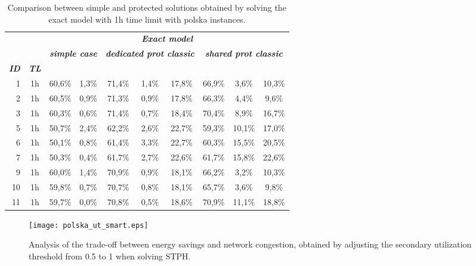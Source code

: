 \documentclass[final,5p,times,twocolumn]{elsarticle}
\begin{document}
\begin{table}[!tbp]
\centering
\scriptsize
\tabcolsep 3pt
\begin{tabular}{rccccccccc}
& & \multicolumn{8}{c}{\textbf{\textit{Exact model}}} \\
\cline{3-10}
& & \multicolumn{2}{c}{\textbf{\textit{simple case}}} & \multicolumn{3}{c}{\textbf{\textit{dedicated prot classic}}} & \multicolumn{3}{c}{\textbf{\textit{shared prot classic}}}  \\ 
\hline
\textbf{\textit{ID}} & \textbf{\textit{TL}} & \textbf{\textit{}} & \textbf{\textit{}} & \textbf{\textit{}} & \textbf{\textit{}} & \textbf{\textit{}} & \textbf{\textit{}} & \textbf{\textit{}} & \textbf{\textit{}} \\ 
\hline
1 & 1h & 60,6\% & 1,3\% & 71,4\% & 1,4\% & 17,8\% & 66,9\% & 3,6\% & 10,3\%   \\
2 & 1h & 60,5\% & 0,9\% & 71,3\% & 0,9\% & 17,8\% & 66,3\% & 4,4\% & 9,6\%    \\ 
3 & 1h & 60,3\% & 0,6\% & 71,4\% & 0,7\% & 18,4\% & 70,4\% & 8,9\% & 16,7\%   \\
5 & 1h & 50,7\% & 2,4\% & 62,2\% & 2,6\% & 22,7\% & 59,3\% & 10,1\% & 17,0\%  \\
6 & 1h & 50,1\% & 0,8\% & 61,4\% & 3,3\% & 22,7\% & 60,3\% & 15,5\% & 20,5\%  \\
7 & 1h & 50,3\% & 0,4\% & 61,7\% & 2,7\% & 22,6\% & 61,7\% & 15,8\% & 22,6\%  \\
9 & 1h & 60,0\% & 1,4\% & 70,9\% & 0,9\% & 18,1\% & 66,2\% & 3,2\% & 10,3\%   \\
10 & 1h & 59,8\% & 0,7\% & 70,7\% & 0,8\% & 18,1\% & 65,7\% & 3,6\% & 9,8\%   \\
11 & 1h & 59,7\% & 0,0\% & 70,8\% & 0,5\% & 18,6\% & 70,9\% & 11,1\% & 18,8\% \\
\end{tabular}
\caption{Comparison between simple and protected solutions obtained by solving the exact model with 1h time limit with polska instances.}
\label{tab:polska_model_protected}
\end{table}


\begin{figure*}[!ht]\centering
  \texttt{[image: polska\_ut\_smart.eps]}
  \caption{Analysis of the trade-off between energy savings and network congestion, obtained by adjusting the secondary utilization threshold  from 0.5 to 1 when solving STPH.}
\label{fig:trade-off}
\end{figure*}
\end{document}
